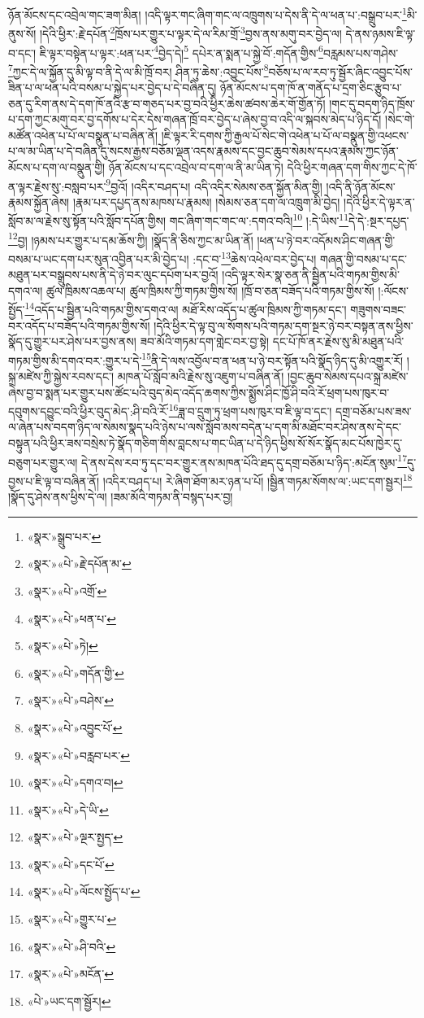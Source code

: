 ཉོན་མོངས་དང་འབྲེལ་གང་ཟག་མིན། །འདི་ལྟར་གང་ཞིག་གང་ལ་འཁྲུགས་པ་དེས་ནི་དེ་ལ་ཕན་པ་:བསྒྲུབ་པར་\footnote{«སྣར་»སྒྲུབ་པར་}མི་ནུས་སོ། །དེའི་ཕྱིར་:རྗེ་དཔོན་\footnote{«སྣར་»«པེ་»རྗེ་དཔོན་མ་}ཁྲོས་པར་གྱུར་པ་ལྟར་དེ་ལ་རིམ་གྲོ་\footnote{«སྣར་»«པེ་»འགྲོ་}བྱས་ནས་མགུ་བར་བྱེད་ལ། དེ་ནས་ཉམས་ཇི་ལྟ་བ་དང་། ཇི་ལྟར་བསྟེན་པ་ལྟར་:ཕན་པར་\footnote{«སྣར་»«པེ་»ཕན་པ་}བྱེད་དེ།\footnote{«སྣར་»«པེ་»ཏེ།} དཔེར་ན་སྨན་པ་སྐྱེ་བོ་:གདོན་གྱིས་\footnote{«སྣར་»«པེ་»གདོན་གྱི་}བརླམས་པས་གཤེས་\footnote{«སྣར་»«པེ་»བཤེས་}ཀྱང་དེ་ལ་སྐྱོན་དུ་མི་ལྟ་བ་ནི་དེ་ལ་མི་ཁྲོ་བར། ཤིན་ཏུ་ཆེས་:འབྱུང་པོས་\footnote{«སྣར་»«པེ་»འབྱུང་པོ་}བཅོས་པ་ལ་རབ་ཏུ་སྦྱོར་ཞིང་འབྱུང་པོས་ཟིན་པ་ལ་ཕན་པའི་བསམ་པ་སྐྱེད་པར་བྱེད་པ་དེ་བཞིན་དུ། ཉོན་མོངས་པ་དག་ཁོ་ན་གནོད་པ་དྲག་ཅིང་རྩུབ་པ་ཅན་དུ་རིག་ནས་དེ་དག་ཁོ་ནའི་རྩ་བ་གཅད་པར་བྱ་བའི་ཕྱིར་ཆེས་ཚབས་ཆེར་གོ་གྱོན་ཏོ། །གང་དུ་བདག་ཉིད་ཁྲོས་པ་དག་ཀྱང་མགུ་བར་བྱ་དགོས་པ་དེར་དེས་གཞན་ཁྲོ་བར་བྱེད་པ་ཞེས་བྱ་བ་འདི་ལ་སྐབས་མེད་པ་ཉིད་དོ། །སེང་གེ་མཚོན་འཕེན་པ་པོ་ལ་བསྣུན་པ་བཞིན་ནོ། །ཇི་ལྟར་རི་དགས་ཀྱི་རྒྱལ་པོ་སེང་གེ་འཕེན་པ་པོ་ལ་བསྣུན་གྱི་འཕངས་པ་ལ་མ་ཡིན་པ་དེ་བཞིན་དུ་སངས་རྒྱས་བཅོམ་ལྡན་འདས་རྣམས་དང་བྱང་ཆུབ་སེམས་དཔའ་རྣམས་ཀྱང་ཉོན་མོངས་པ་དག་ལ་བསྣུན་གྱི། ཉོན་མོངས་པ་དང་འབྲེལ་བ་དག་ལ་ནི་མ་ཡིན་ཏེ། དེའི་ཕྱིར་གཞན་དག་གིས་ཀྱང་དེ་ཁོ་ན་ལྟར་རྗེས་སུ་:བསླབ་པར་\footnote{«སྣར་»«པེ་»བརླབ་པར་}བྱའོ། །འདིར་བཤད་པ། འདི་འདིར་སེམས་ཅན་སྐྱོན་མིན་གྱི། །འདི་ནི་ཉོན་མོངས་རྣམས་སྐྱོན་ཞེས། །རྣམ་པར་དཔྱད་ནས་མཁས་པ་རྣམས། །སེམས་ཅན་དག་ལ་འཁྲུག་མི་བྱེད། །དེའི་ཕྱིར་དེ་ལྟར་ན་སློབ་མ་ལ་རྗེས་སུ་སྟོན་པའི་སློབ་དཔོན་གྱིས། གང་ཞིག་གང་གང་ལ་:དགའ་བའི།\footnote{«སྣར་»«པེ་»དགའ་བ།} །:དེ་ཡིས་\footnote{«སྣར་»«པེ་»དེ་ཡི་}དེ་དེ་:སྔར་དཔྱད་\footnote{«སྣར་»«པེ་»ལྔར་སྤྱད་}བྱ། །ཉམས་པར་གྱུར་པ་དམ་ཆོས་ཀྱི། །སྣོད་ནི་ཅིས་ཀྱང་མ་ཡིན་ནོ། །ཕན་པ་ཉེ་བར་འདོམས་ཤིང་གཞན་གྱི་བསམ་པ་ཡང་དག་པར་སུན་འབྱིན་པར་མི་བྱེད་པ། :དང་བ་\footnote{«སྣར་»«པེ་»དང་པོ་}ཆེས་འཕེལ་བར་བྱེད་པ། གཞན་གྱི་བསམ་པ་དང་མཐུན་པར་བསྒྲུབས་པས་ནི་དེ་ཉེ་བར་ལུང་དཔོག་པར་བྱའོ། །འདི་ལྟར་སེར་སྣ་ཅན་ནི་སྦྱིན་པའི་གཏམ་གྱིས་མི་དགའ་ལ། ཚུལ་ཁྲིམས་འཆལ་པ། ཚུལ་ཁྲིམས་ཀྱི་གཏམ་གྱིས་སོ། །ཁྲོ་བ་ཅན་བཟོད་པའི་གཏམ་གྱིས་སོ། །:ལོངས་སྤྱོད་\footnote{«སྣར་»«པེ་»ལོངས་སྤྱོད་པ་}འདོད་པ་སྦྱིན་པའི་གཏམ་གྱིས་དགའ་ལ། མཐོ་རིས་འདོད་པ་ཚུལ་ཁྲིམས་ཀྱི་གཏམ་དང་། གཟུགས་བཟང་བར་འདོད་པ་བཟོད་པའི་གཏམ་གྱིས་སོ། །དེའི་ཕྱིར་དེ་ལྟ་བུ་ལ་སོགས་པའི་གཏམ་དག་སྔར་ཉེ་བར་བསྟན་ནས་ཕྱིས་སྣོད་དུ་གྱུར་པར་ཤེས་པར་བྱས་ནས། ཟབ་མོའི་གཏམ་དག་གླེང་བར་བྱ་སྟེ། དང་པོ་ཁོ་ནར་རྗེས་སུ་མི་མཐུན་པའི་གཏམ་གྱིས་མི་དགའ་བར་:གྱུར་པ་དེ་\footnote{«སྣར་»«པེ་»གྱུར་པ་}ནི་དེ་ལས་འབྱོལ་བ་ན་ཕན་པ་ཉེ་བར་སྟོན་པའི་སྣོད་ཉིད་དུ་མི་འགྱུར་རོ། །སྐྲ་མཛེས་ཀྱི་སྐྱེས་རབས་དང་། མཁན་པོ་སློབ་མའི་རྗེས་སུ་འཇུག་པ་བཞིན་ནོ། །བྱང་ཆུབ་སེམས་དཔའ་སྐྲ་མཛེས་ཞེས་བྱ་བ་སྨན་པར་གྱུར་པས་ཚོང་པའི་བུད་མེད་འདོད་ཆགས་ཀྱིས་སྨྱོས་ཤིང་ཁྱོ་ཤི་བའི་རོ་ཕྲག་པས་ཁུར་བ་དབུགས་དབྱུང་བའི་ཕྱིར་བུད་མེད་:ཤི་བའི་རོ་\footnote{«སྣར་»«པེ་»ཤི་བའི་}ཟླ་བ་དྲུག་ཏུ་ཕྲག་པས་ཁུར་བ་ཇི་ལྟ་བ་དང་། དགྲ་བཅོམ་པས་ཟས་ལ་ཞེན་པས་བདག་ཉིད་ལ་སེམས་སྣད་པའི་ཉེས་པ་ལས་སློབ་མས་བདེན་པ་དག་མི་མཐོང་བར་ཤེས་ནས་དེ་དང་བསྟུན་པའི་ཕྱིར་ཟས་བསྲེས་ཏེ་སྣོད་གཅིག་གིས་བླངས་པ་གང་ཡིན་པ་དེ་ཉིད་ཕྱིས་སོ་སོར་སྣོད་མང་པོས་ཁྱེར་དུ་བཅུག་པར་གྱུར་ལ། དེ་ནས་དེས་རབ་ཏུ་དང་བར་གྱུར་ནས་མཁན་པོའི་ཐད་དུ་དགྲ་བཅོམ་པ་ཉིད་:མངོན་སུམ་\footnote{«སྣར་»«པེ་»མངོན་}དུ་བྱས་པ་ཇི་ལྟ་བ་བཞིན་ནོ། །འདིར་བཤད་པ། རེ་ཞིག་ཐོག་མར་ཉན་པ་པོ། །སྦྱིན་གཏམ་སོགས་ལ་:ཡང་དག་སྦྱར།\footnote{«པེ་»ཡང་དག་སྦྱོར།} །སྣོད་དུ་ཤེས་ནས་ཕྱིས་དེ་ལ། །ཟམ་མོའི་གཏམ་ནི་བསྙད་པར་བྱ། 